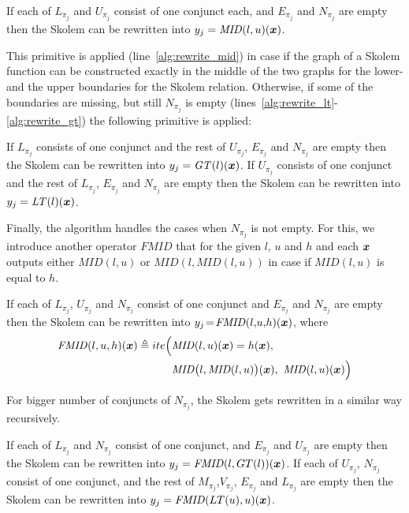 \begin{lemma}
If each of $L_{\pi_j}$ and $U_{\pi_j}$ consist of one conjunct each, and $E_{\pi_j}$ and $N_{\pi_j}$ are empty then the Skolem can be rewritten into $y_j = \mathit{MID} (l, u)(\vx)$. 
\end{lemma}
This primitive is applied (line~\ref{alg:rewrite_mid}) in case if the graph of a Skolem function can be constructed exactly in the middle of the two graphs for the lower- and the upper boundaries for the Skolem relation.
Otherwise, if some of the boundaries are missing, but still $N_{\pi_j}$ is empty (lines~\ref{alg:rewrite_lt}-\ref{alg:rewrite_gt})  the following primitive is applied:

\begin{lemma}
If $L_{\pi_j}$ consists of one conjunct and the rest of $U_{\pi_j}$, $E_{\pi_j}$ and $N_{\pi_j}$ are empty then the Skolem can be rewritten into $y_j = \mathit{GT} (l)(\vx)$.
If $U_{\pi_j}$ consists of one conjunct and the rest of $L_{\pi_j}$, $E_{\pi_j}$ and $N_{\pi_j}$ are empty then the Skolem can be rewritten into $y_j = \mathit{LT} (l)(\vx)$.
\end{lemma}

Finally, the algorithm handles the cases when $N_{\pi_j}$ is not empty.
For this, we introduce another operator $\mathit{FMID}$ that for the given $l$, $u$ and $h$ and each $\vx$ outputs either $\mathit{MID}(l,u)$ or $\mathit{MID}(l,\mathit{MID}(l,u))$ in case if $\mathit{MID}(l,u)$ is equal to $h$.

\begin{lemma}
If each of $L_{\pi_j}$,\! $U_{\pi_j}$\! and $N_{\pi_j}$ consist of one conjunct and $E_{\pi_j}$ and $N_{\pi_j}$ are empty then the Skolem can be rewritten into $y_j\! =\! \mathit{FMID} (l,\! u,\! h)(\vx)$, where%
\begin{align}
\mathit{FMID}(l, u, h) (\vx) \triangleq ite \Big(&\mathit{MID}(l, u) (\vx) = h(\vx),  \notag \\
                          &\mathit{MID}\big(l, \mathit{MID}(l, u)\big) (\vx), \,\,
                          \mathit{MID}(l, u) (\vx)\Big) \notag 
\end{align}
\end{lemma}
For bigger number of conjuncts of $N_{\pi_j}$, the Skolem gets rewritten
in a similar way recursively.


\begin{lemma}
If each of $L_{\pi_j}$ and $N_{\pi_j}$  consist of one conjunct, and $E_{\pi_j}$ and $U_{\pi_j}$ are empty then the Skolem can be rewritten into $y_j = \mathit{FMID} (l, GT(l))(\vx)$. 
If each of $U_{\pi_j}$, $N_{\pi_j}$  consist of one conjunct, and the rest of $M_{\pi_j} $,$V_{\pi_j}$, $E_{\pi_j}$ and $L_{\pi_j}$ are empty then the Skolem can be rewritten into $y_j = \mathit{FMID} (LT(u), u)(\vx)$. 
\end{lemma}


